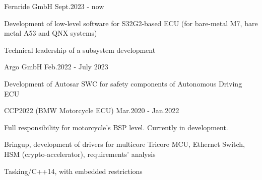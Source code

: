 


\begin{cventries}


\cventry
{} %
{ Fernride GmbH} %
{} %
{Sept.2023 - now} %
{ %
\begin{cvitems}
\item {Development of low-level software for S32G2-based ECU (for bare-metal M7, bare metal A53 and QNX systems)}
\item {Technical leadership of a subsystem development}
\end{cvitems}
}
\newline
\newline


\cventry
{} %
{Argo GmbH } %
{} %
{Feb.2022 - July 2023} %
{ %
\begin{cvitems}
\item {Development of Autosar SWC for safety components of Autonomous Driving ECU}
\end{cvitems}
}
\newline
\newline

\cventry
{} %
{CCP2022 (BMW Motorcycle ECU)} %
{} %
{Mar.2020 - Jan.2022} %
{ %
\begin{cvitems}
\item {Full responsibility for motorcycle's BSP level. Currently in development.}
\item {Bringup, development of drivers for multicore Tricore MCU, Ethernet Switch, HSM (crypto-accelerator), requirements' analysis}
\item {Tasking/C++14, with embedded restrictions}
\end{cvitems}
}
\newline
\newline


\end{cventries}

